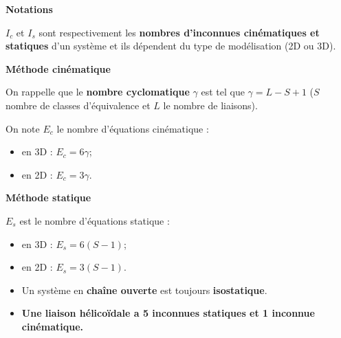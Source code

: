 \begin{defi}\small{\textbf{\textsf{Notations}}}

$I_c$ et $I_s$ sont respectivement les \textbf{nombres d'inconnues cinématiques et statiques} d'un système et ils dépendent du type de modélisation (2D ou 3D).

\vspace{-.6cm}

\begin{multicols}{2}
\begin{center}
\textbf{Méthode cinématique}
\end{center}


On rappelle que le \textbf{nombre cyclomatique}  $\gamma$
est tel que $\gamma=L-S+1$ ($S$ nombre de classes d'équivalence et $L$ le nombre de liaisons).

On note $E_c$ le nombre d'équations cinématique :%
\begin{itemize}
 \item en 3D : $E_c=6\gamma$;%
 \item en 2D : $E_c=3\gamma$.%
\end{itemize}

\vfill\null
\columnbreak

\begin{center}
\textbf{Méthode statique} 
\end{center}


$E_s$ est le nombre d'équations statique :
\begin{itemize}
\item en 3D : $E_s=6 (S-1)$;
\item en 2D : $E_s=3 (S-1)$.
\end{itemize}

\end{multicols}
\end{defi}

\begin{rem}

\begin{itemize}
\item Un système en \textbf{chaîne ouverte} est toujours \textbf{isostatique}.%
\item \textbf{Une liaison hélicoïdale a 5 inconnues statiques et 1 inconnue cinématique.}
\end{itemize}
\end{rem}


